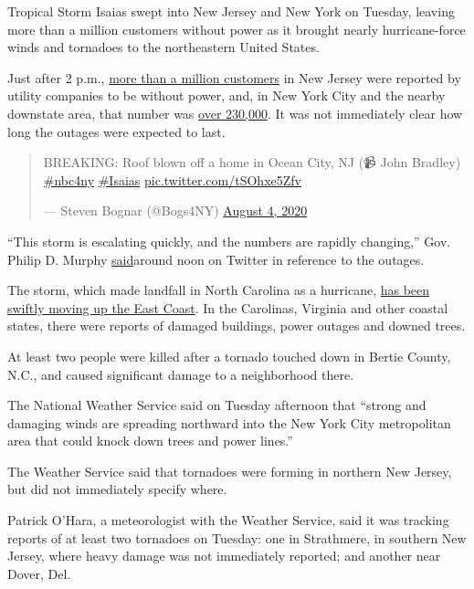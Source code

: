 Tropical Storm Isaias swept into New Jersey and New York on Tuesday,
leaving more than a million customers without power as it brought nearly
hurricane-force winds and tornadoes to the northeastern United States.

Just after 2 p.m.,
\href{https://poweroutage.us/area/state/new\%20jersey}{more than a
million customers} in New Jersey were reported by utility companies to
be without power, and, in New York City and the nearby downstate area,
that number was
\href{https://poweroutage.us/area/state/new\%20york}{over 230,000}. It
was not immediately clear how long the outages were expected to last.

\begin{quote}
BREAKING: Roof blown off a home in Ocean City, NJ (📹 John Bradley)
\href{https://twitter.com/hashtag/nbc4ny?src=hash\&ref_src=twsrc\%5Etfw}{\#nbc4ny}
\href{https://twitter.com/hashtag/Isaias?src=hash\&ref_src=twsrc\%5Etfw}{\#Isaias}
\href{https://t.co/tSOhxe5Zfv}{pic.twitter.com/tSOhxe5Zfv}

--- Steven Bognar (@Bogs4NY)
\href{https://twitter.com/Bogs4NY/status/1290669802198114309?ref_src=twsrc\%5Etfw}{August
4, 2020}
\end{quote}

``This storm is escalating quickly, and the numbers are rapidly
changing,'' Gov. Philip D. Murphy
\href{https://twitter.com/GovMurphy/status/1290684560326512650}{said}around
noon on Twitter in reference to the outages.

The storm, which made landfall in North Carolina as a hurricane,
\href{https://www.nytimes.com/2020/08/04/us/isaias-storm-updates.html?action=click\&module=Top\%20Stories\&pgtype=Homepage\#link-34e5d4e4}{has
been swiftly moving up the East Coast}. In the Carolinas, Virginia and
other coastal states, there were reports of damaged buildings, power
outages and downed trees.

At least two people were killed after a tornado touched down in Bertie
County, N.C., and caused significant damage to a neighborhood there.

The National Weather Service said on Tuesday afternoon that ``strong and
damaging winds are spreading northward into the New York City
metropolitan area that could knock down trees and power lines.''

The Weather Service said that tornadoes were forming in northern New
Jersey, but did not immediately specify where.

Patrick O'Hara, a meteorologist with the Weather Service, said it was
tracking reports of at least two tornadoes on Tuesday: one in
Strathmere, in southern New Jersey, where heavy damage was not
immediately reported; and another near Dover, Del.

